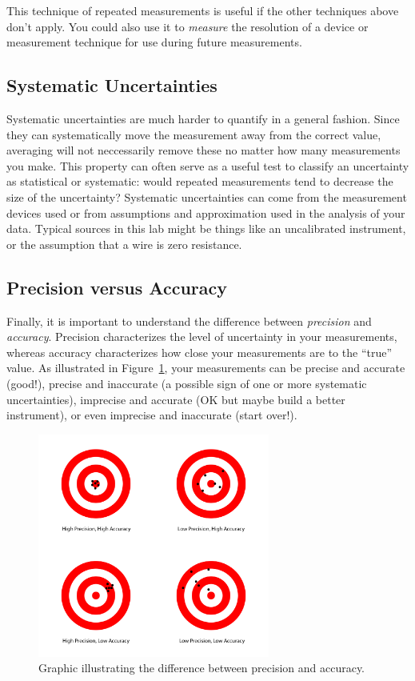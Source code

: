 This technique of repeated measurements is useful if the other techniques above
don't apply.  You could also use it to {\em measure} the resolution of a device
or measurement technique for use during future measurements. 

\subsection{Systematic Uncertainties}

Systematic uncertainties are much harder to quantify in a general fashion.
Since they can systematically move the measurement away from the correct value,
averaging will not neccessarily remove these no matter how many measurements you
make.  This property can often serve as a useful test to classify an uncertainty
as statistical or systematic: would repeated measurements tend to decrease the
size of the uncertainty?  Systematic uncertainties can come from the measurement
devices used or from assumptions and approximation used in the analysis of your
data.  Typical sources in this lab might be things like an uncalibrated
instrument, or the assumption that a wire is zero resistance. 

\subsection{Precision versus Accuracy}

Finally, it is important to understand the difference between \textit{precision}
and \textit{accuracy}. Precision characterizes the level of uncertainty in your
measurements, whereas accuracy characterizes how close your measurements are to
the ``true'' value. As illustrated in
Figure~\ref{fig:precacc}, your measurements can be precise and accurate (good!),
precise and inaccurate (a possible sign of one or more systematic
uncertainties), imprecise and accurate (OK but maybe build a better instrument),
or even imprecise and inaccurate (start over!).

\begin{figure}
\includegraphics[width=3in]{../images/precision-accuracy.png}
\caption{Graphic illustrating the difference between precision and accuracy.}
\label{fig:precacc}
\end{figure}

